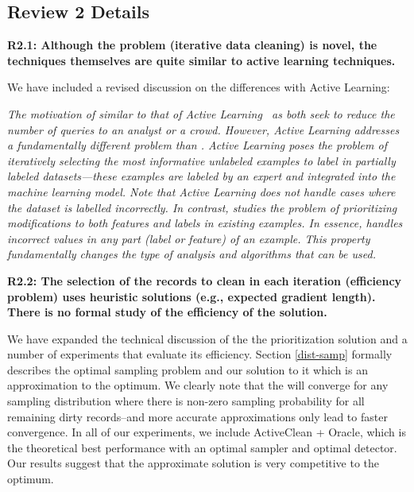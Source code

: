 \subsection*{Review 2 Details}

\noindent\textbf{R2.1: Although the problem (iterative data cleaning) is novel, the techniques themselves are quite similar to active learning techniques.}

\noindent  We have included a revised discussion on the differences with Active Learning:

\emph{ The motivation of \sys similar to that of Active Learning~\cite{DBLP:journals/pvldb/YakoutENOI11,gokhale2014corleone} as both seek to reduce the number of queries to an analyst or a crowd.
However, Active Learning addresses a fundamentally different problem than \sys.
Active Learning poses the problem of iteratively selecting the most informative {\it unlabeled} examples to label in partially labeled datasets---these
examples are labeled by an expert and integrated into the machine learning model.
Note that Active Learning does not handle cases where the dataset is labelled incorrectly.
In contrast, \sys studies the problem of prioritizing modifications to both features and labels in existing examples.
In essence, \sys handles incorrect values in {\it any} part (label or feature) of an example.
This property fundamentally changes the type of analysis and algorithms that can be used.}

\vspace{0.5em}

\noindent\textbf{R2.2: The selection of the records to clean in each iteration (efficiency problem) uses heuristic solutions (e.g., expected gradient length). There is no formal study of the efficiency of the solution.}

\noindent  We have expanded the technical discussion of the the prioritization solution and a number of experiments that evaluate its efficiency. Section \ref{dist-samp} formally describes the optimal sampling problem and our solution to it which is an approximation to the optimum. We clearly note that the \sys will converge for any sampling distribution where there is non-zero sampling probability for all remaining dirty records--and more accurate approximations only lead to faster convergence. In all of our experiments, we include ActiveClean + Oracle, which is the theoretical best performance with an optimal sampler and optimal detector.
Our results suggest that the approximate solution is very competitive to the optimum. 

